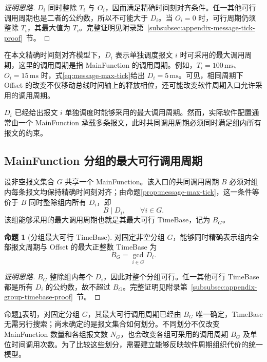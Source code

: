 \documentclass[UTF8,a4paper,twoside,zihao=-4]{ctexart}
\numberwithin{equation}{section}
\numberwithin{figure}{section}
\numberwithin{table}{section}
\theoremstyle{definition}
\newtheorem{proposition}{命题}
\numberwithin{algocf}{section}
\begin{document}
\begin{proof}[\normalfont 证明思路]
$D_i$ 同时整除 $T_i$ 与 $O_i$，因而满足精确时间刻对齐条件。任一其他可行调用周期也是二者的公约数，所以不可能大于 $D_i$。当 $O_i=0$ 时，可行周期仍须整除 $T_i$，其最大值为 $T_i$。完整证明见附录第~\ref{subsubsec:appendix-message-tick-proof}~节。
\end{proof}

在本文精确时间刻对齐模型下，$D_i$ 表示单独调度报文 $i$ 时可采用的最大调用周期，这里的调用周期是指 MainFunction 的调用周期。例如，$T_i=100\,\mathrm{ms}$、$O_i=15\,\mathrm{ms}$ 时，式\eqref{eq:message-max-tick}给出 $D_i=5\,\mathrm{ms}$。可见，相同周期下 Offset 的改变不仅移动总线时间轴上的释放相位，还可能改变软件周期入口允许采用的调用周期。

$D_i$ 已经给出报文 $i$ 单独调度时能够采用的最大调用周期。然而，实际软件配置通常由一个 MainFunction 承载多条报文，此时共同调用周期必须同时满足组内所有报文的约束。

\subsection{MainFunction 分组的最大可行调用周期}
\label{subsec:group-max-timebase}

设非空报文集合 $G$ 共享一个 MainFunction。该入口的共同调用周期 $B$ 必须对组内每条报文均保持精确时间刻对齐；由命题\ref{prop:message-max-tick}，这一条件等价于 $B$ 同时整除组内所有 $D_i$，即
\begin{equation}
 B\mid D_i,
 \qquad
 \forall i\in G.
\label{eq:group-feasible-timebase}
\end{equation}
该组能够采用的最大调用周期也就是其最大可行 TimeBase，记为 $B_G$。

\begin{proposition}[分组最大可行 TimeBase]
\label{prop:group-max-timebase}
对固定非空分组 $G$，能够同时精确表示组内全部报文周期与 Offset 的最大正整数 TimeBase 为
\begin{equation}
 B_G
 =
 \gcd_{i\in G}D_i.
\label{eq:group-max-timebase}
\end{equation}
\end{proposition}

\begin{proof}[\normalfont 证明思路]
$B_G$ 整除组内每个 $D_i$，因此对整个分组可行。任一其他可行 TimeBase 都是所有 $D_i$ 的公约数，故不超过 $B_G$。完整证明见附录第~\ref{subsubsec:appendix-group-timebase-proof}~节。
\end{proof}

命题\ref{prop:group-max-timebase}表明，对固定分组 $G$，其最大可行调用周期已经由 $B_G$ 唯一确定，TimeBase 无需另行搜索；尚未确定的是报文集合如何划分。不同划分不仅改变 MainFunction 数量和各组报文数 $N_G$，也会改变各组可采用的调用周期 $B_G$ 及单位时间调用次数。为了比较这些划分，需要建立能够反映软件周期组织代价的统一模型。
\end{document}
